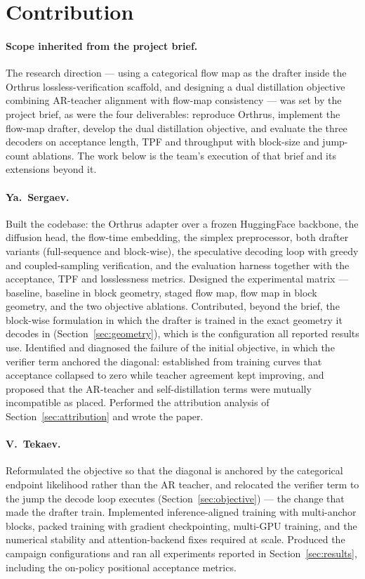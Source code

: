 \documentclass{zapiski}
\begin{document}
\section{Contribution}
\label{sec:contribution}

\paragraph{Scope inherited from the project brief.} The research direction ---
using a categorical flow map as the drafter inside the Orthrus
lossless-verification scaffold, and designing a dual distillation objective
combining AR-teacher alignment with flow-map consistency --- was set by the
project brief, as were the four deliverables: reproduce Orthrus, implement the
flow-map drafter, develop the dual distillation objective, and evaluate the
three decoders on acceptance length, TPF and throughput with block-size and
jump-count ablations. The work below is the team's execution of that brief and
its extensions beyond it.

\paragraph{Ya.~Sergaev.} Built the codebase: the Orthrus adapter over a frozen
HuggingFace backbone, the diffusion head, the flow-time embedding, the simplex
preprocessor, both drafter variants (full-sequence and block-wise), the
speculative decoding loop with greedy and coupled-sampling verification, and
the evaluation harness together with the acceptance, TPF and losslessness
metrics. Designed the experimental matrix --- baseline, baseline in block
geometry, staged flow map, flow map in block geometry, and the two objective
ablations. Contributed, beyond the brief, the block-wise formulation in which
the drafter is trained in the exact geometry it decodes in
(Section~\ref{sec:geometry}), which is the configuration all reported results
use. Identified and diagnosed the failure of the initial objective, in which
the verifier term anchored the diagonal: established from training curves that
acceptance collapsed to zero while teacher agreement kept improving, and
proposed that the AR-teacher and self-distillation terms were mutually
incompatible as placed. Performed the attribution analysis of
Section~\ref{sec:attribution} and wrote the paper.

\paragraph{V.~Tekaev.} Reformulated the objective so that the diagonal is
anchored by the categorical endpoint likelihood rather than the AR teacher, and
relocated the verifier term to the jump the decode loop executes
(Section~\ref{sec:objective}) --- the change that made the drafter train.
Implemented inference-aligned training with multi-anchor blocks, packed
training with gradient checkpointing, multi-GPU training, and the numerical
stability and attention-backend fixes required at scale. Produced the campaign
configurations and ran all experiments reported in
Section~\ref{sec:results}, including the on-policy positional acceptance
metrics.
\end{document}
